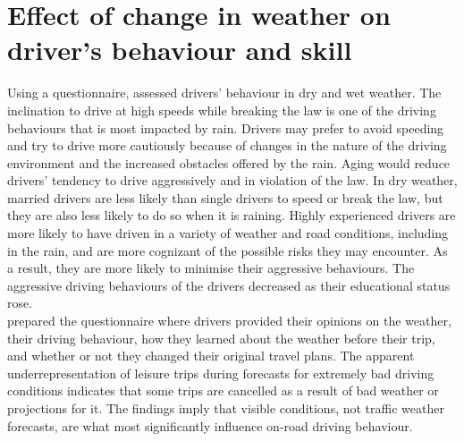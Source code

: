 \documentclass[12pt,letterpaper]{report}
\begin{document}
\section{Effect of change in weather on driver's behaviour and skill}
Using a questionnaire, \textbf{\cite{bakhshi2022evaluating}} assessed drivers' behaviour in dry and wet weather. The inclination to drive at high speeds while breaking the law is one of the driving behaviours that is most impacted by rain. Drivers may prefer to avoid speeding and try to drive more cautiously because of changes in the nature of the driving environment and the increased obstacles offered by the rain. Aging would reduce drivers' tendency to drive aggressively and in violation of the law. In dry weather, married drivers are less likely than single drivers to speed or break the law, but they are also less likely to do so when it is raining. Highly experienced drivers are more likely to have driven in a variety of weather and road conditions, including in the rain, and are more cognizant of the possible risks they may encounter. As a result, they are more likely to minimise their aggressive behaviours. The aggressive driving behaviours of the drivers decreased as their educational status rose.\\

\textbf{\cite{kilpelainen2007effects}} prepared the questionnaire where drivers provided their opinions on the weather, their driving behaviour, how they learned about the weather before their trip, and whether or not they changed their original travel plans. The apparent underrepresentation of leisure trips during forecasts for extremely bad driving conditions indicates that some trips are cancelled as a result of bad weather or projections for it. The findings imply that visible conditions, not traffic weather forecasts, are what most significantly influence on-road driving behaviour.
\end{document}
